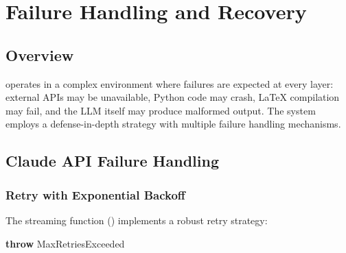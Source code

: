 \chapter{Failure Handling and Recovery}
\label{ch:failure}

\section{Overview}
\label{sec:failure:overview}

\autoscholar operates in a complex environment where failures are expected at every layer: external APIs may be unavailable, Python code may crash, \LaTeX{} compilation may fail, and the LLM itself may produce malformed output.
The system employs a defense-in-depth strategy with multiple failure handling mechanisms.

\section{Claude API Failure Handling}
\label{sec:failure:claude}

\subsection{Retry with Exponential Backoff}

The streaming function  () implements a robust retry strategy:

\begin{algorithm}[H]
\caption{Claude API Retry Strategy}
\label{alg:claude-retry}
\SetAlgoLined
{}

\textbf{throw} MaxRetriesExceeded\;
\end{algorithm}

